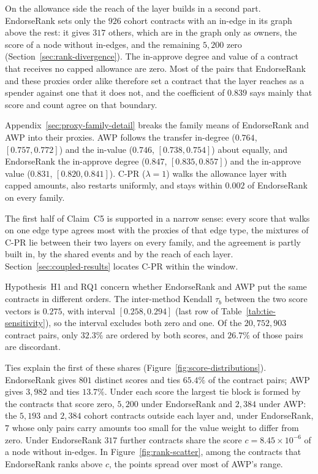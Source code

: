On the allowance side the reach of the layer builds in a second part. EndorseRank sets only the $926$ cohort contracts with an in-edge in its graph above the rest: it gives $317$ others, which are in the graph only as owners, the score of a node without in-edges, and the remaining $5{,}200$ zero (Section~\ref{sec:rank-divergence}). The in-approve degree and value of a contract that receives no capped allowance are zero. Most of the pairs that EndorseRank and these proxies order alike therefore set a contract that the layer reaches as a spender against one that it does not, and the coefficient of $0.839$ says mainly that score and count agree on that boundary.

Appendix~\ref{sec:proxy-family-detail} breaks the family means of EndorseRank and AWP into their proxies. AWP follows the transfer in-degree ($0.764$, $[0.757,0.772]$) and the in-value ($0.746$, $[0.738,0.754]$) about equally, and EndorseRank the in-approve degree ($0.847$, $[0.835,0.857]$) and the in-approve value ($0.831$, $[0.820,0.841]$). \mbox{C-PR} ($\lambda=1$) walks the allowance layer with capped amounts, also restarts uniformly, and stays within $0.002$ of EndorseRank on every family.

The first half of Claim~C5 is supported in a narrow sense: every score that walks on one edge type agrees most with the proxies of that edge type, the mixtures of \mbox{C-PR} lie between their two layers on every family, and the agreement is partly built in, by the shared events and by the reach of each layer. Section~\ref{sec:coupled-results} locates \mbox{C-PR} within the window.


Hypothesis~H1 and RQ1 concern whether EndorseRank and AWP put the same contracts in different orders. The inter-method Kendall $\tau_b$ between the two score vectors is $0.275$, with interval $[0.258,0.294]$ (last row of Table~\ref{tab:tie-sensitivity}), so the interval excludes both zero and one. Of the $20{,}752{,}903$ contract pairs, only $32.3\%$ are ordered by both scores, and $26.7\%$ of those pairs are discordant.

Ties explain the first of these shares (Figure~\ref{fig:score-distributions}). EndorseRank gives $801$ distinct scores and ties $65.4\%$ of the contract pairs; AWP gives $3{,}982$ and ties $13.7\%$. Under each score the largest tie block is formed by the contracts that score zero, $5{,}200$ under EndorseRank and $2{,}384$ under AWP: the $5{,}193$ and $2{,}384$ cohort contracts outside each layer and, under EndorseRank, $7$ whose only pairs carry amounts too small for the value weight to differ from zero. Under EndorseRank $317$ further contracts share the score $c=8.45\times10^{-6}$ of a node without in-edges. In Figure~\ref{fig:rank-scatter}, among the contracts that EndorseRank ranks above $c$, the points spread over most of AWP's range.


